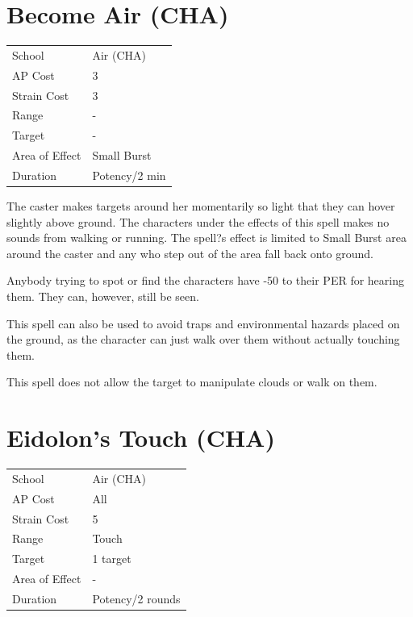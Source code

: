 \documentclass[11pt,a4paper,twocolumn]{book}
\begin{document}
	\section*{Become Air (CHA)}
	{
		\begin{tabu} to 75mm{| X[l,4] | X[l,7] |}
			\hline
			School 			&  Air (CHA)			\\
			AP Cost	      	&  3					\\
			Strain Cost     &  3					\\
			Range     		&  -					\\
			Target      	&  -					\\
			Area of Effect  &  Small Burst	 		\\
			Duration     	&  Potency/2 min		\\ \hline
		\end{tabu}
		
	}
	
	\medskip
	
	The caster makes targets around her momentarily so light that they can hover slightly above ground. The characters under the effects of this spell makes no sounds from walking or running. The spell?s effect is limited to Small Burst area around the caster and any who step out of the area fall back onto ground.
	
	Anybody trying to spot or find the characters have -50 to their PER for hearing them. They can, however, still be seen. 
	
	This spell can also be used to avoid traps and environmental hazards placed on the ground, as the character can just walk over them without actually touching them.
	
	This spell does not allow the target to manipulate clouds or walk on them.
	
		\section*{Eidolon's Touch (CHA)}
	{
		\begin{tabu} to 75mm{| X[l,4] | X[l,7] |}
			\hline
			School 			&  Air (CHA)			\\
			AP Cost	      	&  All					\\
			Strain Cost     &  5					\\
			Range     		&  Touch				\\
			Target      	&  1 target				\\
			Area of Effect  &  -	 				\\
			Duration     	&  Potency/2 rounds		\\ \hline
		\end{tabu}
		
	}
	
\end{document}

